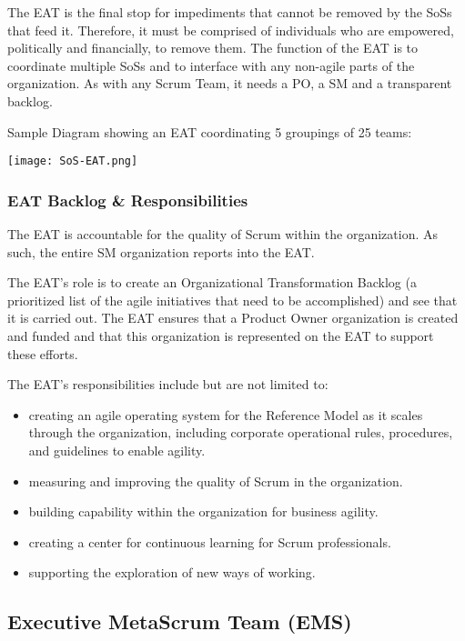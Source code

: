 \documentclass[12pt,a4paper,parskip=full]{scrartcl}
\begin{document}
The EAT is the final stop for impediments that cannot be removed by the SoSs that feed it. Therefore, it must be comprised of individuals who are empowered, politically and financially, to remove them. The function of the EAT is to coordinate multiple SoSs and to interface with any non-agile parts of the organization. As with any Scrum Team, it needs a PO, a SM and a transparent backlog.

Sample Diagram showing an EAT coordinating 5 groupings of 25 teams:

\texttt{[image: SoS-EAT.png]}

\subsubsection{EAT Backlog \& Responsibilities}

The EAT is accountable for the quality of Scrum within the organization. As such, the entire SM organization reports into the EAT.

The EAT's role is to create an Organizational Transformation Backlog (a prioritized list of the agile initiatives that need to be accomplished) and see that it is carried out. The EAT ensures that a Product Owner organization is created and funded and that this organization is represented on the EAT to support these efforts. 

The EAT's responsibilities include but are not limited to:

\begin{itemize}
	\item creating an agile operating system for the Reference Model as it scales through the organization, including corporate operational rules, procedures, and guidelines to enable agility.
	\item measuring and improving the quality of Scrum in the organization.
	\item building capability within the organization for business agility.
	\item creating a center for continuous learning for Scrum professionals.
	\item supporting the exploration of new ways of working.
\end{itemize}

\subsection{Executive MetaScrum Team (EMS)}
\end{document}
